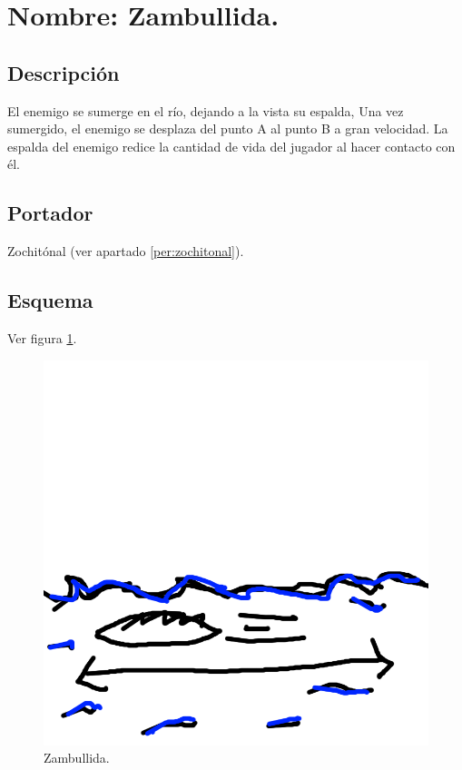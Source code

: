 \section{Nombre: Zambullida.}\label{hab.zambullida}
\subsection{Descripción}
El enemigo se sumerge en el río, dejando a la vista su espalda, Una vez sumergido, el enemigo se desplaza del punto A al punto B a gran velocidad. La espalda del enemigo redice la cantidad de vida del jugador al hacer contacto con él.  
\subsection{Portador}
Zochitónal (ver apartado \ref{per:zochitonal}).
\subsection{Esquema}
			Ver figura \ref{fig:zambullida}.
			\begin{figure}
				\centering
				\includegraphics[height=0.2 \textheight]{Imagenes/zambullida}
				\caption{Zambullida.}
				\label{fig:zambullida}
			\end{figure}